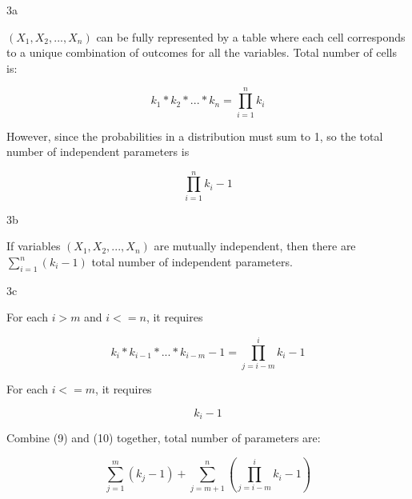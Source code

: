 \clearpage

\LARGE
3a
\normalsize

\begin{answer}
    \((X_1, X_2, ..., X_n)\) can be fully represented by a table where each cell corresponds to a unique combination of outcomes for all the variables. Total number of cells is:

    \begin{equation}
        k_1 * k_2 * ... * k_n = \prod_{i=1}^{n}k_i
    \end{equation}

    However, since the probabilities in a distribution must sum to 1, so the total number of independent parameters is

    \begin{equation}
        \prod_{i=1}^{n}k_i - 1
    \end{equation}
\end{answer}

\LARGE
3b
\normalsize

\begin{answer}
    If variables \((X_1, X_2, ..., X_n)\) are mutually independent, then there are  \(\sum_{i=1}^{n}(k_i - 1)\) total number of independent parameters.
\end{answer}

\LARGE
3c
\normalsize

\begin{answer}
    For each \(i > m\) and \(i <= n\), it requires

    \begin{equation}
      k_i * k_{i-1} * ... * k_{i-m} - 1 = \prod_{j=i-m}^{i}k_i - 1
    \end{equation}

    For each \(i <= m\), it requires

    \begin{equation}
        k_i - 1
    \end{equation}

    Combine (9) and (10) together, total number of parameters are:

    \begin{equation}
        \sum_{j=1}^{m}(k_j-1) + \sum_{j=m+1}^n(\prod_{j=i-m}^{i}k_i - 1)
    \end{equation}
\end{answer}

